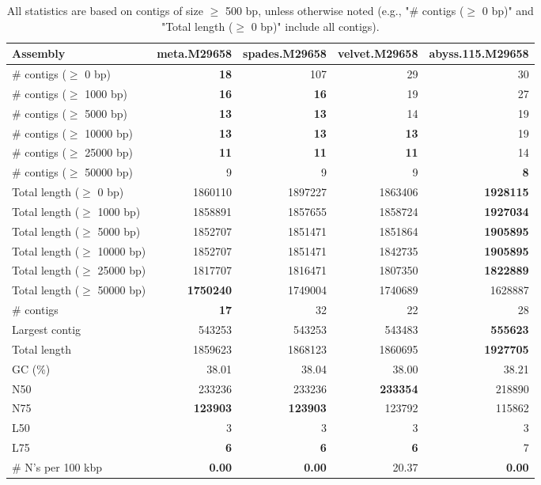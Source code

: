 \documentclass[12pt,a4paper]{article}
\begin{document}
\begin{table}[ht]
\begin{center}
\caption{All statistics are based on contigs of size $\geq$ 500 bp, unless otherwise noted (e.g., "\# contigs ($\geq$ 0 bp)" and "Total length ($\geq$ 0 bp)" include all contigs).}
\begin{tabular}{|l*{4}{|r}|}
\hline
Assembly & meta.M29658 & spades.M29658 & velvet.M29658 & abyss.115.M29658 \\ \hline
\# contigs ($\geq$ 0 bp) & {\bf 18} & 107 & 29 & 30 \\ \hline
\# contigs ($\geq$ 1000 bp) & {\bf 16} & {\bf 16} & 19 & 27 \\ \hline
\# contigs ($\geq$ 5000 bp) & {\bf 13} & {\bf 13} & 14 & 19 \\ \hline
\# contigs ($\geq$ 10000 bp) & {\bf 13} & {\bf 13} & {\bf 13} & 19 \\ \hline
\# contigs ($\geq$ 25000 bp) & {\bf 11} & {\bf 11} & {\bf 11} & 14 \\ \hline
\# contigs ($\geq$ 50000 bp) & 9 & 9 & 9 & {\bf 8} \\ \hline
Total length ($\geq$ 0 bp) & 1860110 & 1897227 & 1863406 & {\bf 1928115} \\ \hline
Total length ($\geq$ 1000 bp) & 1858891 & 1857655 & 1858724 & {\bf 1927034} \\ \hline
Total length ($\geq$ 5000 bp) & 1852707 & 1851471 & 1851864 & {\bf 1905895} \\ \hline
Total length ($\geq$ 10000 bp) & 1852707 & 1851471 & 1842735 & {\bf 1905895} \\ \hline
Total length ($\geq$ 25000 bp) & 1817707 & 1816471 & 1807350 & {\bf 1822889} \\ \hline
Total length ($\geq$ 50000 bp) & {\bf 1750240} & 1749004 & 1740689 & 1628887 \\ \hline
\# contigs & {\bf 17} & 32 & 22 & 28 \\ \hline
Largest contig & 543253 & 543253 & 543483 & {\bf 555623} \\ \hline
Total length & 1859623 & 1868123 & 1860695 & {\bf 1927705} \\ \hline
GC (\%) & 38.01 & 38.04 & 38.00 & 38.21 \\ \hline
N50 & 233236 & 233236 & {\bf 233354} & 218890 \\ \hline
N75 & {\bf 123903} & {\bf 123903} & 123792 & 115862 \\ \hline
L50 & 3 & 3 & 3 & 3 \\ \hline
L75 & {\bf 6} & {\bf 6} & {\bf 6} & 7 \\ \hline
\# N's per 100 kbp & {\bf 0.00} & {\bf 0.00} & 20.37 & {\bf 0.00} \\ \hline
\end{tabular}
\end{center}
\end{table}
\end{document}
